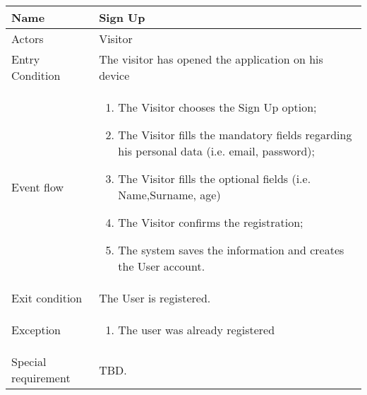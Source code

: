 \begin{tabular}{|p{3.7cm}|p{11cm}|}
  \hline
  Name & Sign Up\\
  \hline
  Actors & Visitor\\
  \hline
  Entry Condition & The visitor has opened the application on his device\\
  \hline
  Event flow & \begin{enumerate}
                  \item The Visitor chooses the Sign Up option;
                  \item The Visitor fills the mandatory fields regarding his personal data (i.e. email, password);
                  \item The Visitor fills the optional fields (i.e. Name,Surname, age)
                  \item The Visitor confirms the registration;
                  \item The system saves the information and creates the User account.
              \end{enumerate}\\
  \hline
  Exit condition & The User is registered.\\
  \hline
  Exception & \begin{enumerate}
                \item The user was already registered 
              \end{enumerate}\\
  \hline
  Special requirement & TBD.\\
  \hline
  \end{tabular}
